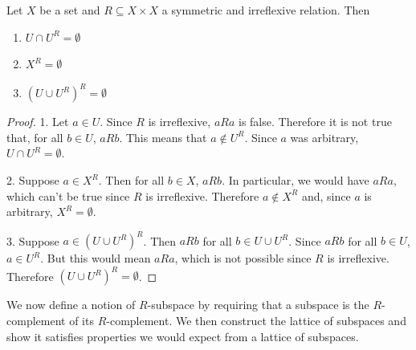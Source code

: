 \begin{mathSection}
	\begin{prop}\label{pm-es-symirreflproperties}
		Let $X$ be a set and $R \subseteq X \times X$ a symmetric and irreflexive relation. Then
		\begin{enumerate}
			\item $U \cap U^{R} = \emptyset$
			\item $X^{R} = \emptyset$
			\item $(U \cup U^{R})^{R} = \emptyset$
		\end{enumerate}
	\end{prop}
	
	\begin{proof}
		1. Let $a \in U$. Since $R$ is irreflexive,  $aRa$ is false. Therefore it is not true that, for all $b \in U$, $aRb$. This means that $a \notin U^{R}$. Since $a$ was arbitrary, $U \cap U^{R} = \emptyset$.
		
		2. Suppose $a \in X^{R}$. Then for all $b \in X$, $aRb$. In particular, we would have $aRa$, which can't be true since $R$ is irreflexive. Therefore $a \notin X^{R}$ and, since $a$ is arbitrary, $X^{R} = \emptyset$.
		
		3. Suppose $a \in (U \cup U^{R})^{R}$. Then $aRb$ for all $b \in U\cup U^{R}$. Since $aRb$ for all $b \in U$, $a \in U^{R}$. But this would mean $aRa$, which is not possible since $R$ is irreflexive. Therefore $(U \cup U^{R})^{R} = \emptyset$.
	\end{proof}
\end{mathSection}

We now define a notion of $R$-subspace by requiring that a subspace is the $R$-complement of its $R$-complement. We then construct the lattice of subspaces and show it satisfies properties we would expect from a lattice of subspaces.

